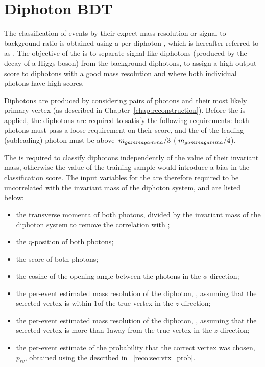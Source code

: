 \section{Diphoton BDT}
\label{cat:sec:dipho_bdt}

The classification of events by their expect mass resolution or signal-to-background ratio is obtained using a per-diphoton \BDT, which is hereafter referred to as \DiPhoBdt. The objective of the \DiPhoBdt is to separate signal-like diphotons (produced by the decay of a Higgs boson) from the \SM background diphotons, to assign a high output score to diphotons with a good mass resolution and where both individual photons have high \PhoIdBdt scores. 

Diphotons are produced by considering pairs of photons and their most likely primary vertex (as described in Chapter~\ref{chap:reconstruction}). Before the \DiPhoBdt is applied, the diphotons are required to satisfy the following requirements: both photons must pass a loose requirement on their \PhoIdBdt score, and the \pT of the leading (subleading) photon must be above $\,m_{gammagamma}/3$ ($\,m_{gammagamma}/4$).

The \DiPhoBdt is required to classify diphotons independently of the value of their invariant mass, otherwise the \mH value of the training sample would introduce a bias in the classification score. The input variables for the \DiPhoBdt are therefore required to be uncorrelated with the invariant mass of the diphoton system, and are listed below:

\begin{itemize}
\item the transverse momenta of both photons, divided by the invariant mass of the diphoton system to remove the correlation with \mH;
\item the $\eta$-position of both photons;
\item the \PhoIdBdt score of both photons;
\item the cosine of the opening angle between the photons in the $\phi$-direction;
\item the per-event estimated mass resolution of the diphoton, \sigmarv, assuming that the selected vertex is within 1\cm of the true vertex in the $z$-direction;
\item the per-event estimated mass resolution of the diphoton, \sigmawv, assuming that the selected vertex is more than 1\cm away from the true vertex in the $z$-direction;
\item the per-event estimate of the probability that the correct vertex was chosen, $p_{rv}$, obtained using the \VtxProbBdt described in \Sec~\ref{reco:sec:vtx_prob}.
\end{itemize}

